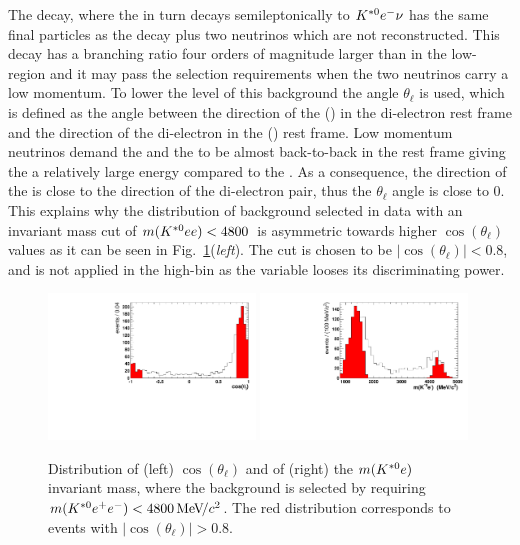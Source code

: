 The \decay{\Bd}{\Dm\ep\nu} decay, where the \Dm in turn decays semileptonically to ${{K}^{*0}}{e^-}\nu$ has the same final particles
as the \BdToKstee decay plus two neutrinos which are not reconstructed. This decay has a branching ratio four orders of magnitude
larger than \BdToKstee in the low-\qsq region and it may pass the selection requirements when the two neutrinos carry a low momentum. 
To lower the level of this background the angle $\theta_\ell$ is used, which is defined as the angle between the direction of the \ep (\en)
in the di-electron rest frame and the direction of the di-electron in the \Bd (\Bdb) rest frame. 
Low momentum neutrinos demand the \Dm and the \ep to be almost back-to-back in the \Bd rest frame giving the \ep a relatively
large energy compared to the \en. As a consequence, the direction of the \ep is close to the direction of the di-electron pair, thus the
$\theta_\ell$ angle is close to 0. This explains why the distribution of background selected in data with an invariant mass cut of
$m({{K}^{*0}} ee) < 4800$~\mevcc is asymmetric towards higher $ \cos (\theta_\ell)$ values as it can be seen in Fig.~\ref{fig:Denu_background}(\emph{left}). 
The cut is chosen to be $|\cos (\theta_\ell) |< 0.8$, and is not applied in the high-\qsq bin as the variable looses its discriminating power.

\begin{figure}[t!]
\centering
\includegraphics[width=0.49\textwidth]{RKst/figs/misreco/CosThetaL_background.pdf}
\includegraphics[width=0.49\textwidth]{RKst/figs/misreco/KstareMass_background.pdf}
\caption{Distribution of (left) $\cos (\theta_\ell)$ and of (right) the $m({{K}^{*0}} e)$ invariant mass, where the  background is selected by requiring $m({{K}^{*0}}{e^+e^-}) < 4800{\mathrm{\,Me\kern -0.1em V\!/}c^2}$. The red distribution corresponds to events with $| \cos ( \theta_\ell ) | > 0.8$.}
\label{fig:Denu_background}
\end{figure}

